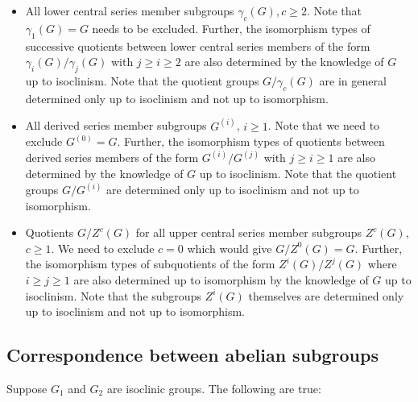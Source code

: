 \begin{itemize}
\item All lower central series member subgroups $\gamma_c(G), c \ge
  2$. Note that $\gamma_1(G) = G$ needs to be excluded. Further, the
  isomorphism types of successive quotients between lower central
  series members of the form $\gamma_i(G)/\gamma_j(G)$ with $j \ge i
  \ge 2$ are also determined by the knowledge of $G$ up to
  isoclinism. Note that the quotient groups $G/\gamma_c(G)$ are in
  general determined only up to isoclinism and not up to isomorphism.

\item All derived series member subgroups $G^{(i)}$, $i \ge 1$. Note
  that we need to exclude $G^{(0)} = G$. Further, the isomorphism
  types of quotients between derived series members of the form
  $G^{(i)}/G^{(j)}$ with $j \ge i \ge 1$ are also determined by the
  knowledge of $G$ up to isoclinism. Note that the quotient groups
  $G/G^{(i)}$ are determined only up to isoclinism and not up to
  isomorphism.
\item Quotients $G/Z^c(G)$ for all upper central series member
  subgroups $Z^c(G)$, $c \ge 1$. We need to exclude $c = 0$ which
  would give $G/Z^0(G) = G$. Further, the isomorphism types of
  subquotients of the form $Z^i(G)/Z^j(G)$ where $i \ge j \ge 1$ are
  also determined up to isomorphism by the knowledge of $G$ up to
  isoclinism. Note that the subgroups $Z^i(G)$ themselves are
  determined only up to isoclinism and not up to isomorphism.
\end{itemize}

\subsection{Correspondence between abelian subgroups}\label{sec:isoclinism-abelian-subgroups}

Suppose $G_1$ and $G_2$ are isoclinic groups. The following are true:

